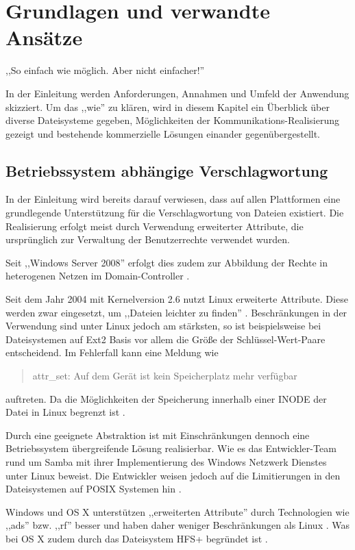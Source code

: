 \documentclass[oneside, ngerman, toc=bibliography,bibliography=totoc,listof=entryprefix, open=right,numbers=noenddot,fontsize=12pt]{scrbook}
\newcommand\chapmd[2]{\begin{mdframed}[%
		rightline=false,leftline=false,topline=false,bottomline=false,frametitlerule=false,
		userdefinedwidth=\textwidth,frametitlealignment=\flushright, %
		frametitlerulecolor=black,frametitle={\small #1}]
		\flushright{} \footnotesize{} #2
	\end{mdframed}}
\begin{document}
\chapter{Grundlagen und verwandte Ansätze}
\chapmd{Albert Einstein (1879--1955)}{,,So einfach wie möglich. Aber nicht einfacher!''}

In der Einleitung werden Anforderungen, Annahmen und Umfeld der Anwendung skizziert.
Um das ,,wie'' zu klären, wird in diesem Kapitel ein Überblick über diverse Dateisysteme gegeben, Möglichkeiten der Kommunikations-Realisierung gezeigt und bestehende kommerzielle Lösungen einander gegenübergestellt.

\section{Betriebssystem abhängige Verschlagwortung}
In der Einleitung wird bereits darauf verwiesen, dass auf allen Plattformen eine grundlegende Unterstützung für die Verschlagwortung von Dateien existiert. Die Realisierung erfolgt meist durch Verwendung erweiterter Attribute, die ursprünglich zur Verwaltung der Benutzerrechte verwendet wurden. 

Seit ,,Windows Server 2008'' erfolgt dies zudem zur Abbildung der Rechte in heterogenen Netzen im Domain-Controller  \cite{windowsserver2008}.

Seit dem Jahr 2004 mit Kernelversion 2.6 nutzt Linux erweiterte Attribute. Diese werden zwar eingesetzt, um ,,Dateien leichter zu finden''  \cite{von2006100}. Beschränkungen in der Verwendung sind unter Linux jedoch am stärksten, so ist beispielsweise bei Dateisystemen auf Ext2 Basis vor allem die Größe der Schlüssel-Wert-Paare entscheidend. Im Fehlerfall kann eine Meldung wie

\begin{quote}
attr\_set: Auf dem Gerät ist kein Speicherplatz mehr verfügbar
\end{quote}

auftreten. Da die Möglichkeiten der Speicherung innerhalb einer INODE der Datei in Linux begrenzt ist \cite{kernelwiki}.

Durch eine geeignete Abstraktion ist mit Einschränkungen dennoch eine Betriebssystem übergreifende Lösung realisierbar. Wie es das Entwickler-Team rund um Samba mit ihrer Implementierung des Windows Netzwerk Dienstes unter Linux beweist. Die Entwickler weisen jedoch auf die Limitierungen in den Dateisystemen auf POSIX Systemen hin  \cite{smb}.

Windows und OS X unterstützen ,,erweiterten Attribute'' durch Technologien wie ,,\acrfull{ads}'' bzw.  ,,\acrfull{rf}'' besser und haben daher weniger Beschränkungen als Linux \cite{surendorf2010mac}.
Was bei OS X zudem durch das Dateisystem HFS+ begründet ist \cite{macdsa}.
\end{document}
